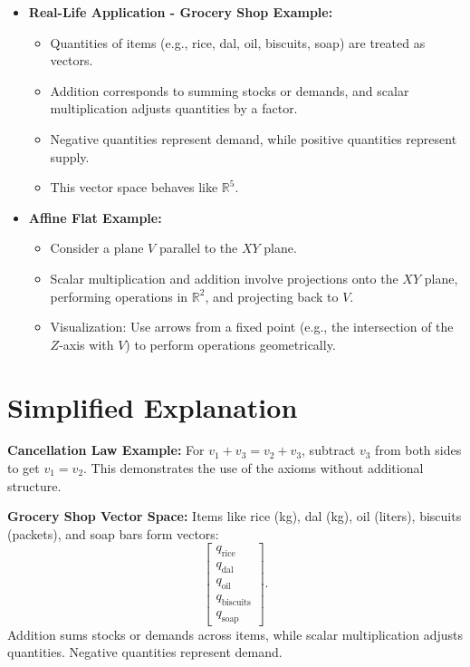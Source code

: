 \documentclass{article}
\begin{document}
\begin{itemize}
  \item \textbf{Real-Life Application - Grocery Shop Example:}
    \begin{itemize}
      \item Quantities of items (e.g., rice, dal, oil, biscuits, soap) are treated as vectors.
      \item Addition corresponds to summing stocks or demands, and scalar multiplication adjusts quantities by a factor.
      \item Negative quantities represent demand, while positive quantities represent supply.
      \item This vector space behaves like $\mathbb{R}^5$.
    \end{itemize}

  \item \textbf{Affine Flat Example:}
    \begin{itemize}
      \item Consider a plane $V$ parallel to the $XY$ plane.
      \item Scalar multiplication and addition involve projections onto the $XY$ plane, performing operations in $\mathbb{R}^2$, and projecting back to $V$.
      \item Visualization: Use arrows from a fixed point (e.g., the intersection of the $Z$-axis with $V$) to perform operations geometrically.
    \end{itemize}
\end{itemize}

\section*{Simplified Explanation}

\textbf{Cancellation Law Example:}
For $v_1 + v_3 = v_2 + v_3$, subtract $v_3$ from both sides to get $v_1 = v_2$. This demonstrates the use of the axioms without additional structure.

\textbf{Grocery Shop Vector Space:}
Items like rice (kg), dal (kg), oil (liters), biscuits (packets), and soap bars form vectors:
\[
  \begin{bmatrix}
    q_{\text{rice}} \\
    q_{\text{dal}} \\
    q_{\text{oil}} \\
    q_{\text{biscuits}} \\
    q_{\text{soap}}
  \end{bmatrix}.
\]
Addition sums stocks or demands across items, while scalar multiplication adjusts quantities. Negative quantities represent demand.
\end{document}
